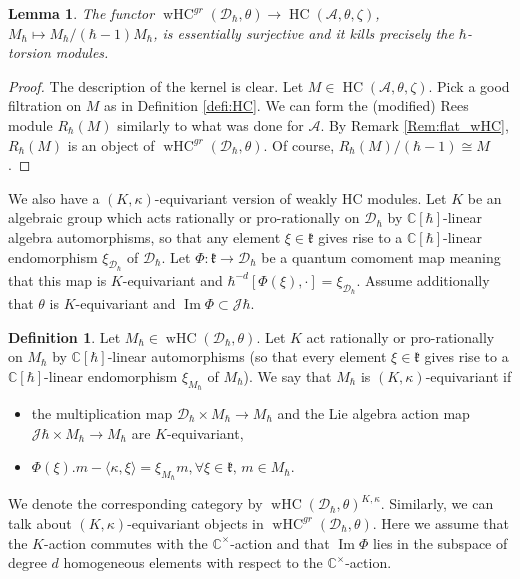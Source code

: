 \documentclass[12pt]{amsart}
\newcommand{\C}{\mathbb{C}}
\newcommand{\A}{\mathcal{A}}
\newcommand{\J}{\mathcal{J}}
\newcommand{\kf}{\mathfrak{k}}
\newcommand{\HC}{\operatorname{HC}}
\newcommand{\wHC}{\operatorname{wHC}}
\newcommand{\Dcal}{\mathcal{D}}
\newtheorem{Lem}[Thm]{Lemma}
\theoremstyle{definition}
\newtheorem{defi}[Thm]{Definition}
\numberwithin{equation}{section}
\begin{document}
\begin{Lem}\label{Lem:essential_surjectivity}
The functor $\wHC^{gr}(\Dcal_\hbar,\theta)\rightarrow \HC(\A,\theta,\zeta)$, $M_\hbar\mapsto M_\hbar/(\hbar-1)M_\hbar$, is essentially surjective
and it kills precisely the $\hbar$-torsion modules.
\end{Lem}
\begin{proof}
The description of the kernel is clear.
Let $M \in \HC(\A,\theta,\zeta)$. Pick a good filtration on $M$ as in Definition
\ref{defi:HC}. We can form the (modified) Rees module $R_\hbar(M)$
similarly to what was done for $\A$. By Remark \ref{Rem:flat_wHC}, $R_\hbar(M)$ is an object of
$\wHC^{gr}(\Dcal_\hbar,\theta)$. Of course, $R_\hbar(M)/(\hbar-1)\cong M$.
\end{proof}

We also have a $(K,\kappa)$-equivariant version of weakly HC modules. Let $K$ be an algebraic group which acts rationally or pro-rationally on $\Dcal_\hbar$ by $\C[\hbar]$-linear algebra automorphisms, so that any element $\xi\in \kf$ gives rise to a $\C[\hbar]$-linear endomorphism $\xi_{\Dcal_\hbar}$ of $\Dcal_\hbar$.
Let $\Phi: \kf\rightarrow \Dcal_\hbar$ be a quantum comoment map
meaning that this map is $K$-equivariant and $\hbar^{-d}[\Phi(\xi),\cdot]=\xi_{\Dcal_\hbar}$.
Assume additionally that $\theta$ is $K$-equivariant and $\operatorname{Im} \Phi \subset \J\hbar$.

\begin{defi}\label{defi_wHC_equiv}
Let $M_\hbar\in \wHC(\Dcal_\hbar,\theta)$.
Let $K$ act rationally or pro-rationally on $M_\hbar$ by $\C[\hbar]$-linear automorphisms (so that every element
$\xi\in \kf$ gives rise to a $\C[\hbar]$-linear endomorphism $\xi_{M_\hbar}$ of $M_\hbar$).  We say that
$M_\hbar$ is $(K,\kappa)$-equivariant if
\begin{itemize}
  	\item the multiplication map $\Dcal_\hbar\times M_\hbar\rightarrow M_\hbar$
  and the Lie algebra action map $\J\hbar \times M_\hbar\rightarrow M_\hbar$
  are $K$-equivariant,
  \item $\Phi(\xi).m-\langle\kappa,\xi\rangle=\xi_{M_\hbar}m, \forall \xi\in \kf, \, m \in M_\hbar$.
\end{itemize}
\end{defi}

We denote the corresponding category by $\wHC(\Dcal_\hbar,\theta)^{K,\kappa}$.
Similarly, we can talk about $(K,\kappa)$-equivariant objects in $\wHC^{gr}(\Dcal_\hbar,\theta)$.
Here we assume that the $K$-action commutes with the $\C^\times$-action and that
$\operatorname{Im}\Phi$ lies in the subspace of degree $d$ homogeneous elements with respect to the $\C^\times$-action.
\end{document}
